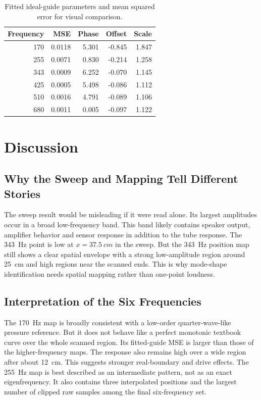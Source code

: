 \documentclass[11pt,a4paper]{article}
\begin{document}
\begin{table}[H]
  \centering
  \caption{Fitted ideal-guide parameters and mean squared error for visual comparison.}
  \begin{tabular}{rrrrr}
    \toprule
    Frequency & MSE & Phase & Offset & Scale \\
    \midrule
    170 & 0.0118 & 5.301 & -0.845 & 1.847 \\
    255 & 0.0071 & 0.830 & -0.214 & 1.258 \\
    343 & 0.0009 & 6.252 & -0.070 & 1.145 \\
    425 & 0.0005 & 5.498 & -0.086 & 1.112 \\
    510 & 0.0016 & 4.791 & -0.089 & 1.106 \\
    680 & 0.0011 & 0.005 & -0.097 & 1.122 \\
    \bottomrule
  \end{tabular}
\end{table}

\section{Discussion}

\subsection{Why the Sweep and Mapping Tell Different Stories}

The sweep result would be misleading if it were read alone. Its largest amplitudes occur in a broad low-frequency band. This band likely contains speaker output, amplifier behavior and sensor response in addition to the tube response. The \SI{343}{Hz} point is low at \(x=\SI{37.5}{cm}\) in the sweep. But the \SI{343}{Hz} position map still shows a clear spatial envelope with a strong low-amplitude region around \SI{25}{cm} and high regions near the scanned ends. This is why mode-shape identification needs spatial mapping rather than one-point loudness.

\subsection{Interpretation of the Six Frequencies}

The \SI{170}{Hz} map is broadly consistent with a low-order quarter-wave-like pressure reference. But it does not behave like a perfect monotonic textbook curve over the whole scanned region. Its fitted-guide MSE is larger than those of the higher-frequency maps. The response also remains high over a wide region after about \SI{12}{cm}. This suggests stronger real-boundary and drive effects. The \SI{255}{Hz} map is best described as an intermediate pattern, not as an exact eigenfrequency. It also contains three interpolated positions and the largest number of clipped raw samples among the final six-frequency set.
\end{document}
